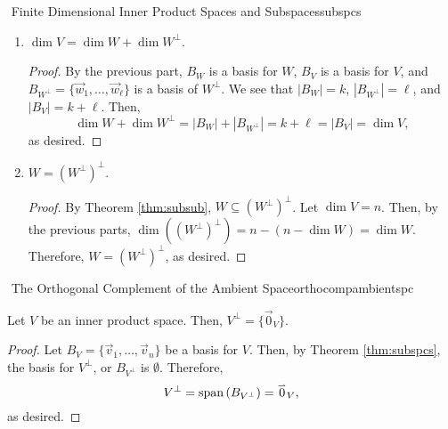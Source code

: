 \begin{theorem}{\Stop\,\,Finite Dimensional Inner Product Spaces and Subspaces}{subspcs}
\begin{enumerate}
\begin{proof}
\begin{equation*}
                    \end{equation*} 
                    meaning that \(\vec{s}\in\Span(\{\vec{w}_1,\ldots,\vec{w}_\ell\})\), or equivalently, \(\vec{s}\in S\), so \(W^\perp\subseteq S\), as desired.
                \end{proof}
                \item \(\dim V=\dim W+\dim W^\perp\).
                \begin{proof}
                    By the previous part, \(B_W\) is a basis for \(W\), \(B_V\) is a basis for \(V\), and \(B_{W^\perp}=\{\vec{w}_1,\ldots,\vec{w}_\ell\}\) is a basis of \(W^\perp\). We see that \(|B_W|=k\), \(|B_{W^\perp}|=\ell\), and \(|B_V|=k+\ell\). Then,
                    \begin{equation*}
                        \dim W+\dim W^\perp=|B_W|+|B_{W^\perp}|=k+\ell=|B_V|=\dim V,
                    \end{equation*}
                    as desired.
                \end{proof}
                \item \(W=(W^\perp)^\perp\).
                \begin{proof}
                    By Theorem \ref{thm:subsub}, \(W\subseteq (W^\perp)^\perp\). Let \(\dim V=n\). Then, by the previous parts, \(\dim ((W^\perp)^\perp)=n-(n-\dim W)=\dim W\). Therefore, \(W=(W^\perp)^\perp\), as desired.
                \end{proof}
            \end{enumerate}

        \end{theorem}
        \pagebreak
        \begin{theorem}{\Stop\,\,The Orthogonal Complement of the Ambient Space}{orthocompambientspc}

            Let \(V\) be an inner product space. Then, \(V^\perp=\{\vec{0}_V\}\).
            \begin{proof}
                Let \(B_V=\{\vec{v}_1,\ldots,\vec{v}_n\}\) be a basis for \(V\). Then, by Theorem \ref{thm:subspcs}, the basis for \(V^\perp\), or \(B_{V^\perp}\) is \(\emptyset\). Therefore,
                \begin{equation*}
                    V^\perp=\text{span\,}(B_{V^\perp})=\overset{_{\rightharpoonup}}{0}_V,
                \end{equation*}
                as desired.
            \end{proof}
            
        \end{theorem}
